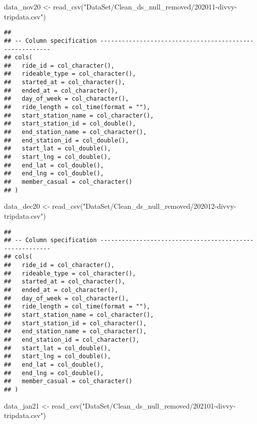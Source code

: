 \documentclass[
]{article}
\newenvironment{Shaded}{\begin{snugshade}}{\end{snugshade}}
\newcommand{\FunctionTok}[1]{\textcolor[rgb]{0.00,0.00,0.00}{#1}}
\newcommand{\NormalTok}[1]{#1}
\newcommand{\OtherTok}[1]{\textcolor[rgb]{0.56,0.35,0.01}{#1}}
\newcommand{\StringTok}[1]{\textcolor[rgb]{0.31,0.60,0.02}{#1}}
\begin{document}
\begin{Shaded}
\begin{Highlighting}[]
\NormalTok{data\_nov20 }\OtherTok{\textless{}{-}} \FunctionTok{read\_csv}\NormalTok{(}\StringTok{"DataSet/Clean\_ds\_null\_removed/202011{-}divvy{-}tripdata.csv"}\NormalTok{)}
\end{Highlighting}
\end{Shaded}

\begin{verbatim}
## 
## -- Column specification --------------------------------------------------------
## cols(
##   ride_id = col_character(),
##   rideable_type = col_character(),
##   started_at = col_character(),
##   ended_at = col_character(),
##   day_of_week = col_character(),
##   ride_length = col_time(format = ""),
##   start_station_name = col_character(),
##   start_station_id = col_double(),
##   end_station_name = col_character(),
##   end_station_id = col_double(),
##   start_lat = col_double(),
##   start_lng = col_double(),
##   end_lat = col_double(),
##   end_lng = col_double(),
##   member_casual = col_character()
## )
\end{verbatim}

\begin{Shaded}
\begin{Highlighting}[]
\NormalTok{data\_dec20 }\OtherTok{\textless{}{-}} \FunctionTok{read\_csv}\NormalTok{(}\StringTok{"DataSet/Clean\_ds\_null\_removed/202012{-}divvy{-}tripdata.csv"}\NormalTok{)}
\end{Highlighting}
\end{Shaded}

\begin{verbatim}
## 
## -- Column specification --------------------------------------------------------
## cols(
##   ride_id = col_character(),
##   rideable_type = col_character(),
##   started_at = col_character(),
##   ended_at = col_character(),
##   day_of_week = col_character(),
##   ride_length = col_time(format = ""),
##   start_station_name = col_character(),
##   start_station_id = col_character(),
##   end_station_name = col_character(),
##   end_station_id = col_character(),
##   start_lat = col_double(),
##   start_lng = col_double(),
##   end_lat = col_double(),
##   end_lng = col_double(),
##   member_casual = col_character()
## )
\end{verbatim}

\begin{Shaded}
\begin{Highlighting}[]
\NormalTok{data\_jan21 }\OtherTok{\textless{}{-}} \FunctionTok{read\_csv}\NormalTok{(}\StringTok{"DataSet/Clean\_ds\_null\_removed/202101{-}divvy{-}tripdata.csv"}\NormalTok{)}
\end{Highlighting}
\end{Shaded}
\end{document}
